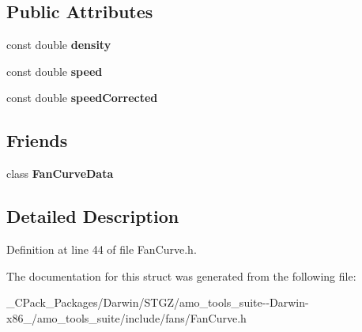 \subsection*{Public Attributes}
\begin{DoxyCompactItemize}
\item 
\mbox{\label{struct_fan_curve_data_1_1_rated_point_ae85a258074490d9691d6ebac53c38b81}} 
const double {\bfseries density}
\item 
\mbox{\label{struct_fan_curve_data_1_1_rated_point_a48f6364f9e14b8a204fef020f967254e}} 
const double {\bfseries speed}
\item 
\mbox{\label{struct_fan_curve_data_1_1_rated_point_a845b68ddecfbdbf42c9ea6f0df607a03}} 
const double {\bfseries speed\+Corrected}
\end{DoxyCompactItemize}
\subsection*{Friends}
\begin{DoxyCompactItemize}
\item 
\mbox{\label{struct_fan_curve_data_1_1_rated_point_a6c0df668730aa3a6673d279f2bbe7799}} 
class {\bfseries Fan\+Curve\+Data}
\end{DoxyCompactItemize}


\subsection{Detailed Description}


Definition at line 44 of file Fan\+Curve.\+h.



The documentation for this struct was generated from the following file\+:\begin{DoxyCompactItemize}
\item 
\+\_\+\+C\+Pack\+\_\+\+Packages/\+Darwin/\+S\+T\+G\+Z/amo\+\_\+tools\+\_\+suite-\/-\/\+Darwin-\/x86\+\_/amo\+\_\+tools\+\_\+suite/include/fans/Fan\+Curve.\+h\end{DoxyCompactItemize}
